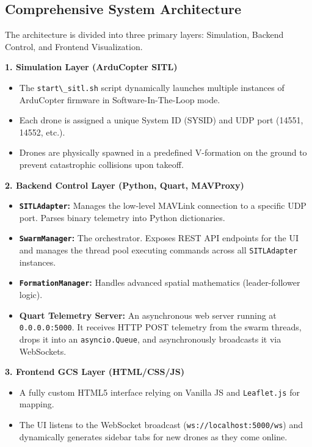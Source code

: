 \documentclass[11pt,a4paper]{article}
\newcommand{\code}[1]{\lstinline[basicstyle=\ttfamily\small,columns=fullflexible]|#1|}
\begin{document}
\subsection{Comprehensive System Architecture}
The architecture is divided into three primary layers: Simulation, Backend Control, and Frontend Visualization.

\textbf{1. Simulation Layer (ArduCopter SITL)}
\begin{itemize}[leftmargin=1.5em]
    \item The \code{start\_sitl.sh} script dynamically launches multiple instances of ArduCopter firmware in Software-In-The-Loop mode.
    \item Each drone is assigned a unique System ID (SYSID) and UDP port (14551, 14552, etc.).
    \item Drones are physically spawned in a predefined V-formation on the ground to prevent catastrophic collisions upon takeoff.
\end{itemize}

\textbf{2. Backend Control Layer (Python, Quart, MAVProxy)}
\begin{itemize}[leftmargin=1.5em]
    \item \textbf{\code{SITLAdapter}:} Manages the low-level MAVLink connection to a specific UDP port. Parses binary telemetry into Python dictionaries.
    \item \textbf{\code{SwarmManager}:} The orchestrator. Exposes REST API endpoints for the UI and manages the thread pool executing commands across all \code{SITLAdapter} instances.
    \item \textbf{\code{FormationManager}:} Handles advanced spatial mathematics (leader-follower logic).
    \item \textbf{Quart Telemetry Server:} An asynchronous web server running at \code{0.0.0.0:5000}. It receives HTTP POST telemetry from the swarm threads, drops it into an \code{asyncio.Queue}, and asynchronously broadcasts it via WebSockets.
\end{itemize}

\textbf{3. Frontend GCS Layer (HTML/CSS/JS)}
\begin{itemize}[leftmargin=1.5em]
    \item A fully custom HTML5 interface relying on Vanilla JS and \code{Leaflet.js} for mapping.
    \item The UI listens to the WebSocket broadcast (\code{ws://localhost:5000/ws}) and dynamically generates sidebar tabs for new drones as they come online.
\end{itemize}
\end{document}
